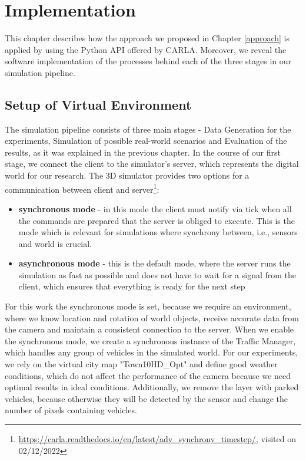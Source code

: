 \chapter{Implementation} \label{implementation}
This chapter describes how the approach we proposed in Chapter \ref{approach} is applied by using the Python API offered by CARLA. Moreover, we reveal the software implementation of the processes behind each of the three stages in our simulation pipeline.  

\section{Setup of Virtual Environment}
The simulation pipeline consists of three main stages - Data Generation for the experiments, Simulation of possible real-world scenarios and Evaluation of the results, as it was explained in the previous chapter. In the course of our first stage, we connect the client to the simulator's server, which represents the digital world for our research. The 3D simulator provides two options for a communication between client and server\footnote{\url{https://carla.readthedocs.io/en/latest/adv_synchrony_timestep/}, visited on 02/12/2022}:
\begin{itemize}
    \item \textbf{synchronous mode} - in this mode the client must notify via tick when all the commands are prepared that the server is obliged to execute. This is the mode which is relevant for simulations where synchrony between, i.e., sensors and world is crucial. 
    \item \textbf{asynchronous mode} - this is the default mode, where the server runs the simulation as fast as possible and does not have to wait for a signal from the client, which ensures that everything is ready for the next step 
\end{itemize}

For this work the synchronous mode is set, because we require an environment, where we know location and rotation of world objects, receive accurate data from the camera and maintain a consistent connection to the server. When we enable the synchronous mode, we create a synchronous instance of the Traffic Manager, which handles any group of vehicles in the simulated world. For our experiments, we rely on the virtual city map "Town10HD\_Opt" and define good weather conditions, which do not affect the performance of the camera because we need optimal results in ideal conditions. Additionally, we remove the layer with parked vehicles, because otherwise they will be detected by the sensor and change the number of pixels containing vehicles.


